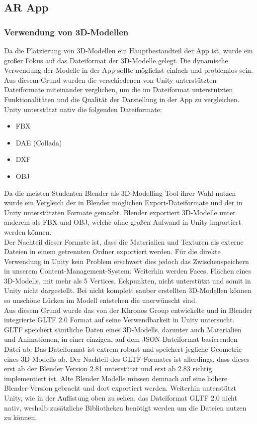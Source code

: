 \documentclass[titlepage, a4paper, 11pt]{scrartcl}
\begin{document}
    \subsection{AR App}

    \subsubsection{Verwendung von 3D-Modellen}\label{3DModels}
    
    Da die Platzierung von 3D-Modellen ein Hauptbestandteil der App ist, wurde ein großer Fokus auf das Dateiformat der 3D-Modelle gelegt. Die dynamische Verwendung der Modelle in der App sollte möglichst einfach und problemlos sein.\\ 
    Aus diesem Grund wurden die verschiedenen von Unity unterstützten Dateiformate miteinander verglichen, um die im Dateiformat unterstützten Funktionalitäten und die Qualität der Darstellung in der App zu vergleichen.\\
    Unity unterstützt nativ die folgenden Dateiformate:
    \begin{itemize}
    \item FBX
    \item DAE (Collada)
    \item DXF
    \item OBJ
    \end{itemize}
    Da die meisten Studenten Blender als 3D-Modelling Tool ihrer Wahl nutzen wurde ein Vergleich der in Blender möglichen Export-Dateiformate und der in Unity unterstützten Formate gemacht. Blender exportiert 3D-Modelle unter anderem als FBX und OBJ, welche ohne großen Aufwand in Unity importiert werden können.\\
    Der Nachteil dieser Formate ist, dass die Materialien und Texturen als externe Dateien in einem getrennten Ordner exportiert werden. Für die direkte Verwendung in Unity kein Problem erschwert dies jedoch das Zwischenspeichern in unserem Content-Management-System. Weiterhin werden \glqq Faces\grqq, Flächen eines 3D-Modells, mit mehr als 5 \glqq Vertices\grqq, Eckpunkten, nicht unterstützt und somit in Unity nicht dargestellt. Bei nicht komplett sauber erstellten 3D-Modellen können so unschöne Lücken im Modell entstehen die unerwünscht sind.\\
    Aus diesem Grund wurde das von der Khronos Group entwickelte und in Blender integrierte GLTF 2.0 Format auf seine Verwendbarkeit in Unity untersucht. GLTF speichert sämtliche Daten eines 3D-Modells, darunter auch Materialien und Animationen, in einer einzigen, auf dem JSON-Dateiformat basierenden Datei ab. Das Dateiformat ist extrem robust und speichert jegliche Geometrie eines 3D-Modells ab. Der Nachteil des GLTF-Formates ist allerdings, dass dieses erst ab der Blender Version 2.81 unterstützt und erst ab 2.83 richtig implementiert ist. Alte Blender Modelle müssen demnach auf eine höhere Blender-Version gebracht und dort exportiert werden. Weiterhin unterstützt Unity, wie in der Auflistung oben zu sehen, das Dateiformat GLTF 2.0 nicht nativ, weshalb zusätzliche Bibliotheken benötigt werden um die Dateien nutzen zu können.\\
\end{document}
